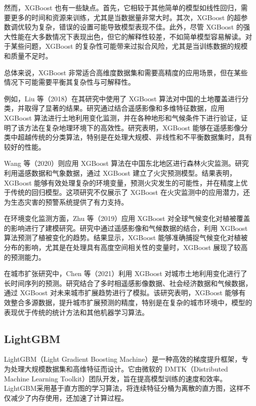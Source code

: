 \documentclass[AutoFakeBold]{LZUThesis-PgD&PhD}
\begin{document}
    然而，XGBoost 也有一些缺点。首先，它相较于其他简单的模型如线性回归，需要更多的时间和资源来训练，尤其是当数据量非常大时。其次，XGBoost 的超参数调优较为复杂，错误的设置可能导致模型表现不佳。此外，尽管 XGBoost 的强大性能在大多数情况下表现出色，但它的解释性较差，不如简单模型容易解读。对于某些问题，XGBoost 的复杂性可能带来过拟合风险，尤其是当训练数据的规模和质量不足时。

    总体来说，XGBoost 非常适合高维度数据集和需要高精度的应用场景，但在某些情况下可能需要平衡其复杂性与可解释性。

    例如，Liu 等（2018）在其研究中使用了 XGBoost 算法对中国的土地覆盖进行分类，并取得了显著的结果\cite{liu2018}。研究通过结合遥感影像和多维特征数据，应用 XGBoost 算法进行土地利用变化监测，并在各种地形和气候条件下进行验证，证明了该方法在复杂地理环境下的高效性。研究表明，XGBoost 能够在遥感影像分类中超越传统的分类算法，特别是在处理大规模、非线性和不平衡数据集时，具有较好的性能。

    Wang 等（2020）则应用 XGBoost 算法在中国东北地区进行森林火灾监测\cite{wang2020Y}。研究利用遥感数据和气象数据，通过 XGBoost 建立了火灾预测模型。结果表明，XGBoost 能够有效处理复杂的环境变量，预测火灾发生的可能性，并在精度上优于传统的回归模型。这项研究不仅展示了 XGBoost 在火灾监测中的应用潜力，还为生态灾害的预警系统提供了有力支持。

    在环境变化监测方面，Zhu 等（2019）应用 XGBoost 对全球气候变化对植被覆盖的影响进行了建模研究\cite{zhu2019}。研究中通过遥感影像和气候数据的结合，利用 XGBoost 算法预测了植被变化的趋势。结果显示，XGBoost 能够准确捕捉气候变化对植被分布的影响，尤其是在处理具有高度空间相关性的变量时，XGBoost 展现了较高的预测能力。

    在城市扩张研究中，Chen 等（2021）利用 XGBoost 对城市土地利用变化进行了长时间序列的预测\cite{chen2021}。研究结合了多时相遥感影像数据、社会经济数据和气候数据，通过 XGBoost 对未来城市扩展趋势进行了模拟。该研究表明，XGBoost 能够有效整合多源数据，提升城市扩展预测的精度，特别是在复杂的城市环境中，模型的表现优于传统的统计方法和其他机器学习算法。



\subsection{LightGBM}
	LightGBM（Light Gradient Boosting Machine）是一种高效的梯度提升框架，专为处理大规模数据集和高维特征而设计。它由微软的 DMTK（Distributed Machine Learning Toolkit）团队开发，旨在提高模型训练的速度和效率。LightGBM采用基于直方图的学习算法，将连续特征分桶为离散的直方图，这样不仅减少了内存使用，还加速了计算过程。
	
\end{document}
